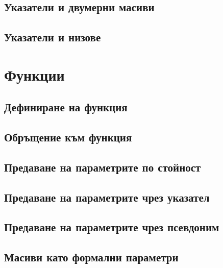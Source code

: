 \documentclass[fleqn,12pt]{article}
\begin{document}
\subsection{Указатели и двумерни масиви}
\subsection{Указатели и низове}

\section{Функции}
\subsection{Дефиниране на функция}
\subsection{Обръщение към функция}
\subsection{Предаване на параметрите по стойност}
\subsection{Предаване на параметрите чрез указател}
\subsection{Предаване на параметрите чрез псевдоним}
\subsection{Масиви като формални параметри}
\end{document}
